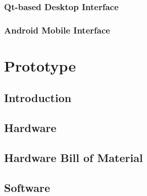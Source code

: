 \documentclass[12pt,]{book}
\begin{document}
		
	\subsection{Qt-based Desktop Interface}
	
	\subsection{Android Mobile Interface}
	
	\newpage
	\chapter{Prototype}
	
	\section{Introduction}
	
	\section{Hardware}
	
	\section{Hardware Bill of Material}
		
	\section{Software}
	
\end{document}
